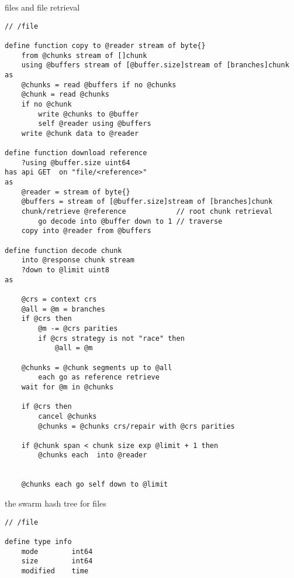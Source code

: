\begin{definition}{files and file retrieval}\label{def:file-retrieval}
\begin{lstlisting}[language=buzz1]
// /file

define function copy to @reader stream of byte{}
    from @chunks stream of []chunk
    using @buffers stream of [@buffer.size]stream of [branches]chunk
as
    @chunks = read @buffers if no @chunks
    @chunk = read @chunks
    if no @chunk
        write @chunks to @buffer
        self @reader using @buffers
    write @chunk data to @reader

define function download reference
    ?using @buffer.size uint64
has api GET  on "file/<reference>" 
as
    @reader = stream of byte{} 
    @buffers = stream of [@buffer.size]stream of [branches]chunk
    chunk/retrieve @reference            // root chunk retrieval
        go decode into @buffer down to 1 // traverse          
    copy into @reader from @buffers 

define function decode chunk 
    into @response chunk stream
    ?down to @limit uint8
as
     
    @crs = context crs
    @all = @m = branches 
    if @crs then
        @m -= @crs parities
        if @crs strategy is not "race" then 
            @all = @m 
        
    @chunks = @chunk segments up to @all 
        each go as reference retrieve 
    wait for @m in @chunks 
    
    if @crs then 
        cancel @chunks
        @chunks = @chunks crs/repair with @crs parities 
    
    if @chunk span < chunk size exp @limit + 1 then
        @chunks each  into @reader
        
       
    @chunks each go self down to @limit  

\end{lstlisting}
\end{definition}


\begin{definition}{the swarm hash tree for files}\label{def:file-info}
\begin{lstlisting}[language=buzz1]
// /file

define type info
    mode        int64 
    size        int64
    modified    time        

\end{lstlisting}
\end{definition}
